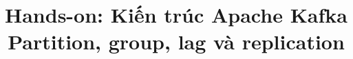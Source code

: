 
\title{\parbox[c][\TitleBlockHeight][c]{0.90\textwidth}{\centering\fontsize{20pt}{24pt}\selectfont\bfseries Hands-on: Kiến trúc Apache Kafka \\ Partition, group, lag và replication}}

\maketitle
\thispagestyle{firstpage}



